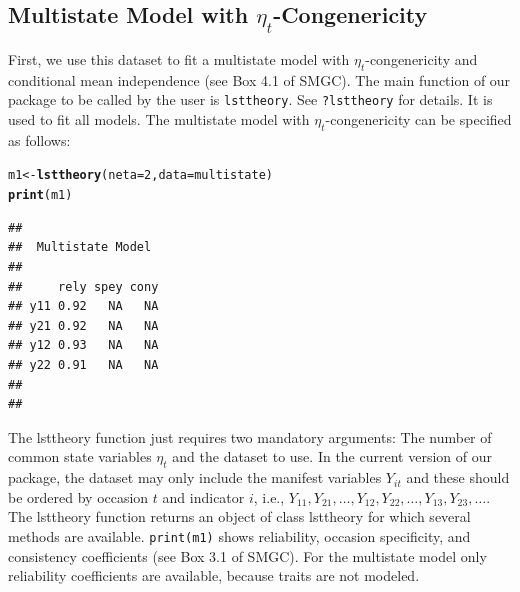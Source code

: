 \documentclass[10pt]{article}\usepackage{graphicx, color}
\makeatletter
\newcommand{\hlfunctioncall}[1]{\textcolor[rgb]{0.501960784313725,0,0.329411764705882}{\textbf{#1}}}%
\newenvironment{kframe}{%
 \def\at@end@of@kframe{}%
 \ifinner\ifhmode%
  \def\at@end@of@kframe{\end{minipage}}%
  \begin{minipage}{\columnwidth}%
 \fi\fi%
 \def\FrameCommand##1{\hskip\@totalleftmargin \hskip-\fboxsep
 \colorbox{shadecolor}{##1}\hskip-\fboxsep
     \hskip-\linewidth \hskip-\@totalleftmargin \hskip\columnwidth}%
 \MakeFramed {\advance\hsize-\width
   \@totalleftmargin\z@ \linewidth\hsize
   \@setminipage}}%
 {\par\unskip\endMakeFramed%
 \at@end@of@kframe}
\newenvironment{knitrout}{}{} %
\makeatother
\begin{document}
%

\subsection{Multistate Model with $\eta_t$-Congenericity}

First, we use this dataset to fit a multistate model with $\eta_t$-congenericity and conditional mean independence (see Box 4.1 of SMGC). The main function of our package to be called by the user is \texttt{lsttheory}. See \texttt{?lsttheory} for details. It is used to fit all models. The multistate model with $\eta_t$-congenericity can be specified as follows:


%
\begin{knitrout}
\color{fgcolor}\begin{kframe}
\begin{alltt}
m1 <- \hlfunctioncall{lsttheory}(neta = 2, data = multistate)
\hlfunctioncall{print}(m1)
\end{alltt}
\begin{verbatim}
## 
##  Multistate Model 
##  
##     rely spey cony
## y11 0.92   NA   NA
## y21 0.92   NA   NA
## y12 0.93   NA   NA
## y22 0.91   NA   NA
## 
## 
\end{verbatim}
\end{kframe}
\end{knitrout}

%

The lsttheory function just requires two mandatory arguments: The number of common state variables $\eta_t$ and the dataset to use. In the current version of our package, the dataset may only include the manifest variables $Y_{it}$ and these should be ordered by occasion $t$ and indicator $i$, i.e., $Y_{11}, Y_{21}, \ldots, Y_{12}, Y_{22}, \ldots, Y_{13}, Y_{23}, \ldots$. The lsttheory function returns an object of class lsttheory for which several methods are available. \texttt{print(m1)} shows reliability, occasion specificity, and consistency coefficients (see Box 3.1 of SMGC). For the multistate model only reliability coefficients are available, because traits are not modeled.
\end{document}
